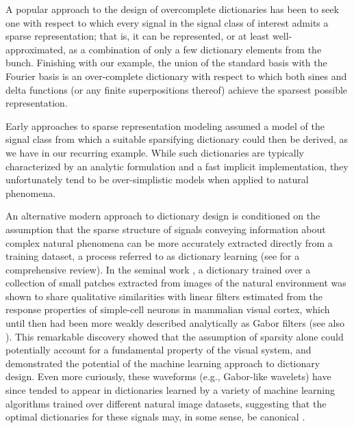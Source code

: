 A popular approach to the design of overcomplete dictionaries has been to seek one with respect to which every signal in the signal class of interest admits a sparse representation; that is, it can be represented, or at least well-approximated, as a combination of only a few dictionary elements from the bunch. Finishing with our example, the union of the standard basis with the Fourier basis is an over-complete dictionary with respect to which both sines and delta functions (or any finite superpositions thereof) achieve the sparsest possible representation.

Early approaches to sparse representation modeling assumed a model of the signal class from which a suitable sparsifying dictionary could then be derived, as we have in our recurring example. While such dictionaries are typically characterized by an analytic formulation and a fast implicit implementation, they unfortunately tend to be over-simplistic models when applied to natural phenomena. 

An alternative modern approach to dictionary design is conditioned on the assumption that the sparse structure of signals conveying information about complex natural phenomena can be more accurately extracted directly from a training dataset, a process referred to as dictionary learning  (see \cite{Zhang15} for a comprehensive review). In the seminal work \cite{Olshausen96}, a dictionary trained over a collection of small patches extracted from images of the natural environment was shown to share qualitative similarities with linear filters estimated from the response properties of simple-cell neurons in mammalian visual cortex, which until then had been more weakly described analytically as Gabor filters (see also \cite{hurri1996image, bell1997independent, van1998independent}). This remarkable discovery showed that the assumption of sparsity alone could potentially account for a fundamental property of the visual system, and demonstrated the potential of the machine learning approach to dictionary design. Even more curiously, these waveforms (e.g., Gabor-like wavelets) have since tended to appear in dictionaries learned by a variety of machine learning algorithms trained over different natural image datasets, suggesting that the optimal dictionaries for these signals may, in some sense, be canonical \cite{donoho2001can}.



